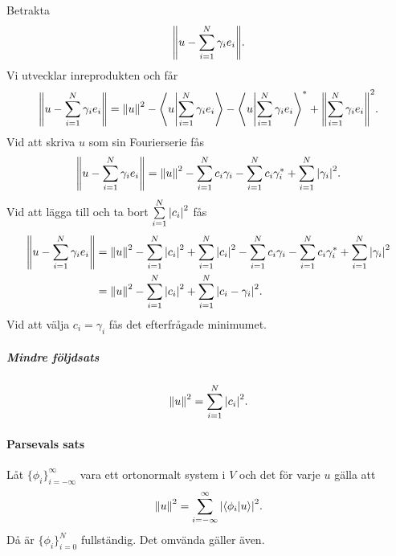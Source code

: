 \proof
Betrakta
\begin{align*}
	\norm{u - \sum\limits_{i = 1}^{N}\gamma_{i}e_{i}}.
\end{align*}
Vi utvecklar inreprodukten och får
\begin{align*}
	\norm{u - \sum\limits_{i = 1}^{N}\gamma_{i}e_{i}} = \norm{u}^{2} - \bra{u}\ket{\sum\limits_{i = 1}^{N}\gamma_{i}e_{i}} - \bra{u}\ket{\sum\limits_{i = 1}^{N}\gamma_{i}e_{i}}^{*} + \norm{\sum\limits_{i = 1}^{N}\gamma_{i}e_{i}}^{2}.
\end{align*}
Vid att skriva $u$ som sin Fourierserie fås
\begin{align*}
	\norm{u - \sum\limits_{i = 1}^{N}\gamma_{i}e_{i}} = \norm{u}^{2} - \sum\limits_{i = 1}^{N}c_{i}\gamma_{i} - \sum\limits_{i = 1}^{N}c_{i}\gamma_{i}^{*} + \sum\limits_{i = 1}^{N}\abs{\gamma_{i}}^{2}.
\end{align*}
Vid att lägga till och ta bort $\sum\limits_{i = 1}^{N}\abs{c_{i}}^{2}$ fås
\begin{align*}
	\norm{u - \sum\limits_{i = 1}^{N}\gamma_{i}e_{i}} &= \norm{u}^{2} - \sum\limits_{i = 1}^{N}\abs{c_{i}}^{2} + \sum\limits_{i = 1}^{N}\abs{c_{i}}^{2} - \sum\limits_{i = 1}^{N}c_{i}\gamma_{i} - \sum\limits_{i = 1}^{N}c_{i}\gamma_{i}^{*} + \sum\limits_{i = 1}^{N}\abs{\gamma_{i}}^{2} \\
	                                                 &= \norm{u}^{2} - \sum\limits_{i = 1}^{N}\abs{c_{i}}^{2} + \sum\limits_{i = 1}^{N}\abs{c_{i} - \gamma_{i}}^{2}.
\end{align*}
Vid att välja $c_{i} = \gamma_{i}$ fås det efterfrågade minimumet.

\subparagraph{Mindre följdsats}
\begin{align*}
	\norm{u}^{2} = \sum\limits_{i = 1}^{N}\abs{c_{i}}^{2}.
\end{align*}

\paragraph{Parsevals sats}
Låt $\{\phi_{i}\}_{i = -\infty}^{\infty}$ vara ett ortonormalt system i $V$ och det för varje $u$ gälla att
\begin{align*}
	\norm{u}^{2} = \sum\limits_{i = -\infty}^{\infty}\abs{\bra{\phi_{i}}\ket{u}}^{2}.
\end{align*}
Då är $\{\phi_{i}\}_{i = 0}^{N}$ fullständig. Det omvända gäller även.

